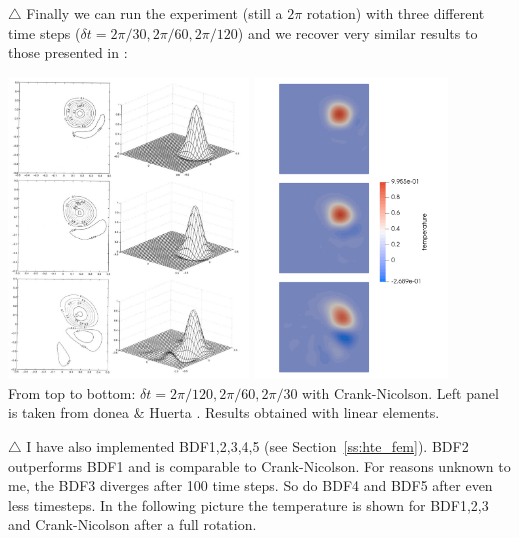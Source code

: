 $\bigtriangleup$ Finally we can run the experiment (still a $2\pi$ rotation) 
with three different time steps ($\delta t=2\pi/30,2\pi/60,2\pi/120$) 
and we recover very similar results to those presented in \cite{dohu03}:
\begin{center}
\includegraphics[height=8cm]{python_codes/fieldstone_43/results/experiment1/dohu03}
\includegraphics[height=8cm]{python_codes/fieldstone_43/results/experiment1/temps_30_60_120}\\
{\captionfont From top to bottom: $\delta t=2\pi/120,2\pi/60,2\pi/30$ with Crank-Nicolson. Left panel is taken from donea \& Huerta \cite{dohu03}. Results obtained with linear elements.}
\end{center}



$\bigtriangleup$ 
I have also implemented BDF1,2,3,4,5  (see Section~\ref{ss:hte_fem}). 
BDF2 outperforms BDF1 and is comparable to Crank-Nicolson. 
For reasons unknown to me, the BDF3 diverges after 100 time steps. So do 
BDF4 and BDF5 after even less timesteps. In the following picture the temperature is shown for 
BDF1,2,3 and Crank-Nicolson after a full rotation.

